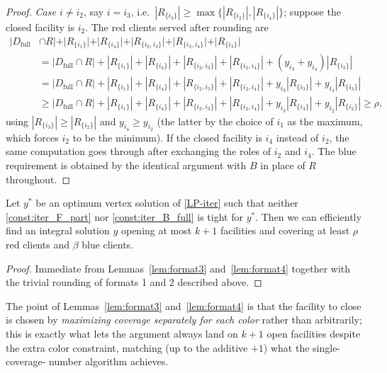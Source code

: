 \documentclass[a4paper,11pt]{article}
\begin{document}
\begin{proof}
\emph{Case $i\ne i_2$}, say $i=i_3$, i.e.\ $|R_{\{i_3\}}|\ge\max\{
|R_{\{i_2\}}|,|R_{\{i_4\}}|\}$; suppose the closed facility is $i_2$. The
red clients served after rounding are
\begin{align*}
|D_\text{full} & \cap R| + |R_{\{i_1\}}| + |R_{\{i_4\}}| + |R_{\{i_2,i_3\}}| + |R_{\{i_2,i_4\}}| + |R_{\{i_3\}}| \\
&=|D_\text{full} \cap R| + |R_{\{i_1\}}| + |R_{\{i_4\}}| + |R_{\{i_2,i_3\}}| + |R_{\{i_2,i_4\}}| + (y_{i_3} + y_{i_4}) |R_{\{i_3\}}| \\
&=|D_\text{full} \cap R| + |R_{\{i_1\}}| + |R_{\{i_4\}}| + |R_{\{i_2,i_3\}}| + |R_{\{i_2,i_4\}}| + y_{i_3}|R_{\{i_3\}}| + y_{i_4} |R_{\{i_3\}}|\\
&\geq|D_\text{full} \cap R| + |R_{\{i_1\}}| + |R_{\{i_4\}}| + |R_{\{i_2,i_3\}}| + |R_{\{i_2,i_4\}}| + y_{i_3}|R_{\{i_3\}}| + y_{i_2} |R_{\{i_2\}}| \geq \rho,
\end{align*}
using $|R_{\{i_3\}}|\ge|R_{\{i_2\}}|$ and $y_{i_4}\ge y_{i_2}$ (the
latter by the choice of $i_1$ as the maximum, which forces $i_2$ to be
the minimum). If the closed facility is $i_4$ instead of $i_2$, the same
computation goes through after exchanging the roles of $i_2$ and $i_4$.
The blue requirement is obtained by the identical argument with $B$ in
place of $R$ throughout.
\end{proof}

\begin{theorem}
\label{thm:colorful_main}
Let $y^*$ be an optimum vertex solution of \eqref{LP-iter} such that
neither \eqref{const:iter_F_part} nor \eqref{const:iter_B_full} is tight
for $y^*$. Then we can efficiently find an integral solution $y$ opening
at most $k+1$ facilities and covering at least $\rho$ red clients and
$\beta$ blue clients.
\end{theorem}
\begin{proof}
Immediate from Lemmas~\ref{lem:format3} and~\ref{lem:format4} together
with the trivial rounding of formats 1 and 2 described above.
\end{proof}

\begin{remark}
The point of Lemmas~\ref{lem:format3} and~\ref{lem:format4} is that the
facility to close is chosen by \emph{maximizing coverage separately for
each color} rather than arbitrarily; this is exactly what lets the
argument always land on $k+1$ open facilities despite the extra color
constraint, matching (up to the additive $+1$) what the single-coverage-
number algorithm achieves.
\end{remark}
\end{document}
